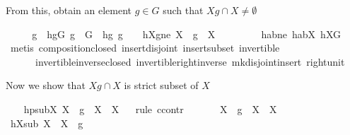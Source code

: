 \begin{isabellebody}
\begin{isamarkuptext}
From this, obtain an element $g \in G$ such that $Xg \cap X \neq \emptyset$%
\end{isamarkuptext}\isamarkuptrue%
\ \ \isamarkupfalse%
\ \isamarkupfalse%
\ g\ \ hgG{\isacharcolon}{\kern0pt}\ {\isachardoublequoteopen}g\ {\isasymin}\ G{\isachardoublequoteclose}\ \ hg{}{\isacharcolon}{\kern0pt}\ {\isachardoublequoteopen}g\ {\isasymnoteq}\ {\isasymone}{\isachardoublequoteclose}\ \ hXgne{\isacharcolon}{\kern0pt}\ {\isachardoublequoteopen}{\isacharparenleft}{\kern0pt}X\ {\isasymcdots}\ {\isacharbraceleft}{\kern0pt}g{\isacharbraceright}{\kern0pt}{\isacharparenright}{\kern0pt}\ {\isasyminter}\ X\ {\isasymnoteq}\ {\isacharbraceleft}{\kern0pt}{\isacharbraceright}{\kern0pt}{\isachardoublequoteclose}\ \isanewline
\ \ \ \ \isamarkupfalse%
\ habne\ habX\ hXG\ \isamarkupfalse%
\ {\isacharparenleft}{\kern0pt}metis\ composition{\isacharunderscore}{\kern0pt}closed\ insert{\isacharunderscore}{\kern0pt}disjoint{\isacharparenleft}{\kern0pt}{}{\isacharparenright}{\kern0pt}\ insert{\isacharunderscore}{\kern0pt}subset\ invertible\ \isanewline
\ \ \ \ \ \ invertible{\isacharunderscore}{\kern0pt}inverse{\isacharunderscore}{\kern0pt}closed\ invertible{\isacharunderscore}{\kern0pt}right{\isacharunderscore}{\kern0pt}inverse{}\ mk{\isacharunderscore}{\kern0pt}disjoint{\isacharunderscore}{\kern0pt}insert\ right{\isacharunderscore}{\kern0pt}unit{\isacharparenright}{\kern0pt}%
\begin{isamarkuptext}%
Now we show that  $Xg \cap X$ is strict subset of $X$%
\end{isamarkuptext}\isamarkuptrue%
\ \ \isamarkupfalse%
\ hpsubX{\isacharcolon}{\kern0pt}\ {\isachardoublequoteopen}{\isacharparenleft}{\kern0pt}X\ {\isasymcdots}\ {\isacharbraceleft}{\kern0pt}g{\isacharbraceright}{\kern0pt}{\isacharparenright}{\kern0pt}\ {\isasyminter}\ X\ {\isasymsubset}\ X{\isachardoublequoteclose}\isanewline
\ \ \isamarkupfalse%
{\isacharparenleft}{\kern0pt}rule\ ccontr{\isacharparenright}{\kern0pt}\isanewline
\ \ \ \ \isamarkupfalse%
\ {\isachardoublequoteopen}{\isasymnot}\ {\isacharparenleft}{\kern0pt}X\ {\isasymcdots}\ {\isacharbraceleft}{\kern0pt}g{\isacharbraceright}{\kern0pt}{\isacharparenright}{\kern0pt}\ {\isasyminter}\ X\ {\isasymsubset}\ X{\isachardoublequoteclose}\isanewline
\ \ \ \ \isamarkupfalse%
\ \isamarkupfalse%
\ hXsub{\isacharcolon}{\kern0pt}\ {\isachardoublequoteopen}X\ {\isasymsubseteq}\ X\ {\isasymcdots}\ {\isacharbraceleft}{\kern0pt}g{\isacharbraceright}{\kern0pt}{\isachardoublequoteclose}\ \isamarkupfalse%

\end{isabellebody}
